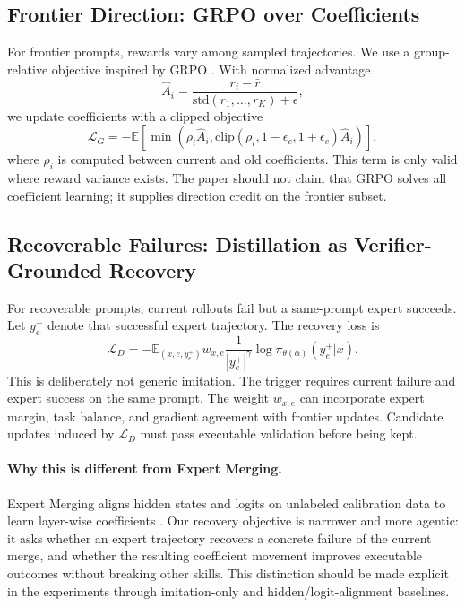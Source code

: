 \documentclass[11pt]{article}
\begin{document}
\subsection{Frontier Direction: GRPO over Coefficients}

For frontier prompts, rewards vary among sampled trajectories.  We use a group-relative objective inspired by GRPO \citep{shao2024deepseekmath}.  With normalized advantage
\begin{equation}
    \hat A_i=\frac{r_i-\bar r}{\mathrm{std}(r_1,\ldots,r_K)+\epsilon},
\end{equation}
we update coefficients with a clipped objective
\begin{equation}
\mathcal{L}_{G}=-\mathbb{E}\left[\min\left(\rho_i\hat A_i,\mathrm{clip}(\rho_i,1-\epsilon_c,1+\epsilon_c)\hat A_i\right)\right],
\end{equation}
where $\rho_i$ is computed between current and old coefficients.  This term is only valid where reward variance exists.  The paper should not claim that GRPO solves all coefficient learning; it supplies direction credit on the frontier subset.

\subsection{Recoverable Failures: Distillation as Verifier-Grounded Recovery}

For recoverable prompts, current rollouts fail but a same-prompt expert succeeds.  Let $y_e^+$ denote that successful expert trajectory.  The recovery loss is
\begin{equation}
    \mathcal{L}_{D}= -\mathbb{E}_{(x,e,y_e^+)} w_{x,e}\frac{1}{|y_e^+|^{\gamma}}\log \pi_{\theta(\alpha)}(y_e^+|x).
\end{equation}
This is deliberately not generic imitation.  The trigger requires current failure and expert success on the same prompt.  The weight $w_{x,e}$ can incorporate expert margin, task balance, and gradient agreement with frontier updates.  Candidate updates induced by $\mathcal{L}_D$ must pass executable validation before being kept.

\paragraph{Why this is different from Expert Merging.}  Expert Merging aligns hidden states and logits on unlabeled calibration data to learn layer-wise coefficients \citep{zhang2025expertmerging}.  Our recovery objective is narrower and more agentic: it asks whether an expert trajectory recovers a concrete failure of the current merge, and whether the resulting coefficient movement improves executable outcomes without breaking other skills.  This distinction should be made explicit in the experiments through imitation-only and hidden/logit-alignment baselines.
\end{document}
